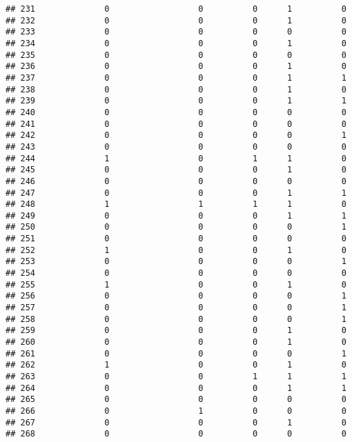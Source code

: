 \documentclass[
]{article}
\begin{document}
\begin{verbatim}
## 231              0                  0          0      1          0
## 232              0                  0          0      1          0
## 233              0                  0          0      0          0
## 234              0                  0          0      1          0
## 235              0                  0          0      0          0
## 236              0                  0          0      1          0
## 237              0                  0          0      1          1
## 238              0                  0          0      1          0
## 239              0                  0          0      1          1
## 240              0                  0          0      0          0
## 241              0                  0          0      0          0
## 242              0                  0          0      0          1
## 243              0                  0          0      0          0
## 244              1                  0          1      1          0
## 245              0                  0          0      1          0
## 246              0                  0          0      0          0
## 247              0                  0          0      1          1
## 248              1                  1          1      1          0
## 249              0                  0          0      1          1
## 250              0                  0          0      0          1
## 251              0                  0          0      0          0
## 252              1                  0          0      1          0
## 253              0                  0          0      0          1
## 254              0                  0          0      0          0
## 255              1                  0          0      1          0
## 256              0                  0          0      0          1
## 257              0                  0          0      0          1
## 258              0                  0          0      0          1
## 259              0                  0          0      1          0
## 260              0                  0          0      1          0
## 261              0                  0          0      0          1
## 262              1                  0          0      1          0
## 263              0                  0          1      1          1
## 264              0                  0          0      1          1
## 265              0                  0          0      0          0
## 266              0                  1          0      0          0
## 267              0                  0          0      1          0
## 268              0                  0          0      0          0

\end{verbatim}
\end{document}
